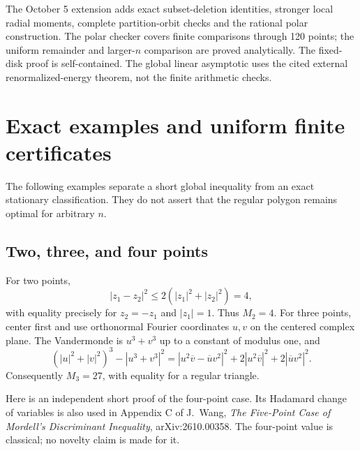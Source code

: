 \documentclass[11pt]{article}
\theoremstyle{remark}
\numberwithin{equation}{section}
\begin{document}
The October 5 extension adds exact subset-deletion identities,
stronger local radial moments, complete partition-orbit checks and the
rational polar construction. The polar checker covers finite comparisons
through 120 points; the uniform remainder and larger-$n$ comparison
are proved analytically. The fixed-disk proof is self-contained. The
global linear asymptotic uses the cited external renormalized-energy
theorem, not the finite arithmetic checks.

\section{Exact examples and uniform finite certificates}
\label{sec:examples-bordered-trace}

The following examples separate a short global inequality from an exact
stationary classification. They do not assert that the regular polygon
remains optimal for arbitrary $n$.

\subsection{Two, three, and four points}
For two points,
\[
 |z_1-z_2|^2\le2(|z_1|^2+|z_2|^2)=4,
\]
with equality precisely for $z_2=-z_1$ and $|z_1|=1$.
Thus $M_2=4$. For three points, center first and use orthonormal
Fourier coordinates $u,v$ on the centered complex plane. The Vandermonde is
$u^3+v^3$ up to a constant of modulus one, and
\[
 (|u|^2+|v|^2)^3-|u^3+v^3|^2
 =|u^2\overline v-\overline u v^2|^2
   +2|u^2\overline v|^2+2|\overline u v^2|^2.
\]
Consequently $M_3=27$, with equality for a regular triangle.

Here is an independent short proof of the four-point case. Its
Hadamard change of variables is also used in Appendix C of
J.~Wang, \emph{The Five-Point Case of Mordell's Discriminant
Inequality}, arXiv:2610.00358. The four-point value is classical;
no novelty claim is made for it.
\end{document}
